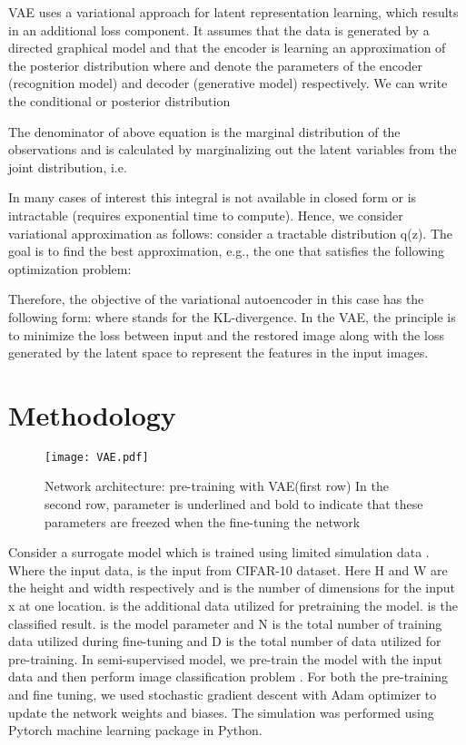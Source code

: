 \documentclass[sigconf, authorversion]{acmart}
\begin{document}
VAE uses a variational approach for latent representation learning, which results in an additional loss component. It assumes that the data is generated by a directed graphical model  and that the encoder is learning an approximation  of the posterior distribution  where  and  denote the parameters of the encoder (recognition model) and decoder (generative model) respectively. We can write the conditional or posterior distribution 

The  denominator of above equation is the marginal distribution of the observations and is calculated by marginalizing out the latent variables from the joint distribution, i.e.

In  many  cases  of  interest  this  integral  is  not  available  in  closed  form  or  is  intractable (requires exponential time to compute). Hence, we consider variational approximation as follows: consider a tractable distribution q(z).  The goal is  to  find  the  best  approximation,  e.g.,  the  one  that  satisfies  the  following  optimization
problem:

Therefore, the objective of the variational autoencoder in this case has the following form: 
 where  stands for the KL-divergence. 
In the VAE, the principle is to minimize the loss between input and the restored image along with the loss generated by the latent space to represent the features in the input images. 

\section{Methodology}

\begin{figure}
    \centering
    \texttt{[image: VAE.pdf]}
    \caption{Network architecture: pre-training with VAE(first row) In the second row, parameter  is underlined and bold to indicate that these parameters are freezed when the fine-tuning the network}
    \label{fig:my_label}
\end{figure}

Consider a surrogate model  which is trained using limited simulation data . Where the input data,  is the input from CIFAR-10 dataset. Here H and W are the height and width respectively and  is the number of dimensions for the input x at one location.   is the additional data utilized for pretraining the model.   is the classified result.  is the model parameter and N is the total number of training data utilized during fine-tuning and D is the total number of data utilized for pre-training. In semi-supervised model, we pre-train the model with the  input data  and then perform image classification problem .
For both the pre-training and fine tuning, we used stochastic gradient descent with Adam optimizer to update the network weights and biases. The simulation was performed using Pytorch machine learning package in Python. 
\end{document}
